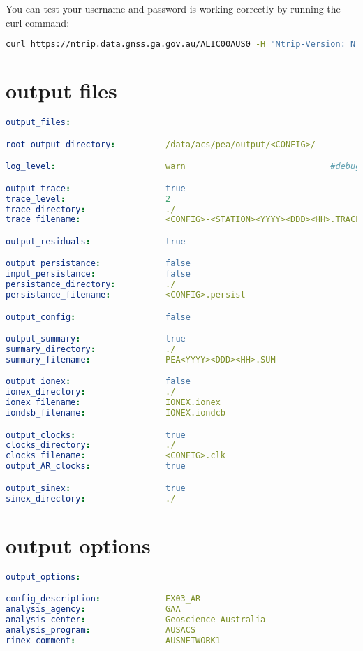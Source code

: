 You can test your username and password is working correctly by running the curl command:
\begin{lstlisting}[language=bash]
curl https://ntrip.data.gnss.ga.gov.au/ALIC00AUS0 -H "Ntrip-Version: NTRIP/2.0" -i  --output - -u <user>
\end{lstlisting}
%
\section{output files}
\begin{lstlisting}[language=yaml,caption=yaml input files configuration example]
output_files:

root_output_directory:          /data/acs/pea/output/<CONFIG>/

log_level:                      warn                             #debug, info, warn, error as defined in boost::log

output_trace:                   true
trace_level:                    2
trace_directory:                ./
trace_filename:                 <CONFIG>-<STATION><YYYY><DDD><HH>.TRACE

output_residuals:               true

output_persistance:             false
input_persistance:              false
persistance_directory:          ./
persistance_filename:           <CONFIG>.persist

output_config:                  false

output_summary:                 true
summary_directory:              ./
summary_filename:               PEA<YYYY><DDD><HH>.SUM

output_ionex:                   false
ionex_directory:                ./
ionex_filename:                 IONEX.ionex
iondsb_filename:                IONEX.iondcb

output_clocks:                  true
clocks_directory:               ./
clocks_filename:                <CONFIG>.clk
output_AR_clocks:               true

output_sinex:                   true
sinex_directory:                ./
\end{lstlisting}

\section{output options}

\begin{lstlisting}[language=yaml,caption=yaml input files configuration example]
output_options:

config_description:             EX03_AR
analysis_agency:                GAA
analysis_center:                Geoscience Australia
analysis_program:               AUSACS
rinex_comment:                  AUSNETWORK1
\end{lstlisting}

